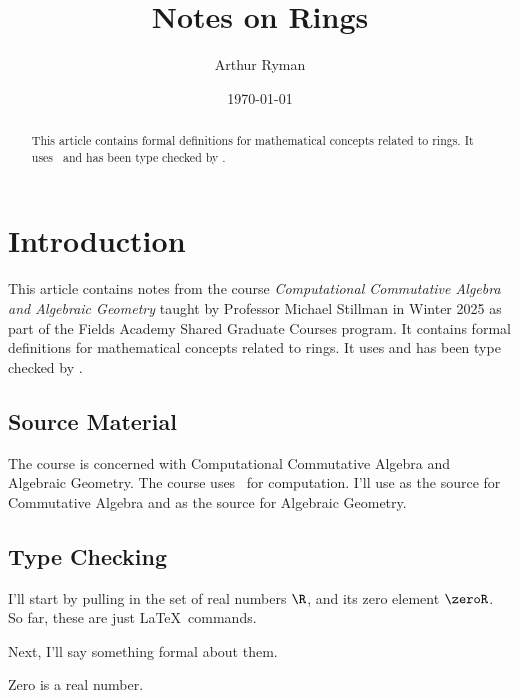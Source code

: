 \documentclass{amsart}
\begin{document}
\title{Notes on Rings}
\author{Arthur Ryman}
\date{\today}

\begin{abstract}
    This article contains formal definitions for mathematical concepts related to rings.
    It uses \ZN\ and has been type checked by \fuzz.
\end{abstract}

\maketitle

\tableofcontents

\section*{Introduction}

This article contains notes from the course \textit{Computational Commutative Algebra and Algebraic Geometry}
taught by Professor Michael Stillman in Winter 2025 as part of the Fields Academy Shared Graduate Courses
program.
It contains formal definitions for mathematical concepts related to rings.
It uses \ZN\cite{spivey-zrm} and has been type checked by \fuzz\cite{spivey-fm}.

\subsection{Source Material}

The course is concerned with Computational Commutative Algebra and Algebraic Geometry.
The course uses \mzMtwo\ for computation.
I'll use \cite{atiyah-itca} as the source for Commutative Algebra
and \cite{hartshorne-ag} as the source for Algebraic Geometry.

\subsection{Type Checking}

I'll start by pulling in the set of real numbers $\R$, and its zero element $\zeroR$.
So far, these are just \LaTeX\ commands.

Next, I'll say something formal about them.

\begin{remark}
Zero is a real number.
\begin{zed}
	\zeroR \in \R
\end{zed}
\end{remark}
\end{document}
